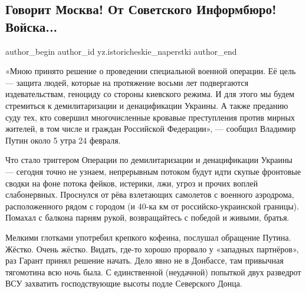  
 
 
 
 
 
\subsection{Говорит Москва! От Советского Информбюро! Войска...}
\label{sec:24_02_2022.yz.istoricheskie_naperstki.1.govorit_moskva}
 
\ifcmt
 author_begin
   author_id yz.istoricheskie_naperstki
 author_end
\fi

«Мною принято решение о проведении специальной военной операции. Её цель —
защита людей, которые на протяжение восьми лет подвергаются издевательствам,
геноциду со стороны киевского режима. И для этого мы будем стремиться к
демилитаризации и денацификации Украины. А также преданию суду тех, кто
совершил многочисленные кровавые преступления против мирных жителей, в том
числе и граждан Российской Федерации», — сообщил Владимир Путин около 5 утра 24
февраля.

Что стало триггером Операции по демилитаризации и денацификации Украины —
сегодня точно не узнаем, непрерывным потоком будут идти скупые фронтовые сводки
на фоне потока фейков, истерики, лжи, угроз и прочих воплей слабонервных.
Проснулся от рёва взлетающих самолетов с военного аэродрома, расположенного
рядом с городом (и 40-ка км от российско-украинской границы). Помахал с балкона
парням рукой, возвращайтесь с победой и живыми, братья.

Мелкими глотками употребил крепкого кофеина, послушал обращение Путина. Жёстко.
Очень жёстко. Видать, где-то хорошо прорвало у «западных партнёров», раз Гарант
принял решение начать. Дело явно не в Донбассе, там привычная тягомотина всю
ночь была. С единственной (неудачной) попыткой двух разведрот ВСУ захватить
господствующие высоты подле Северского Донца.


